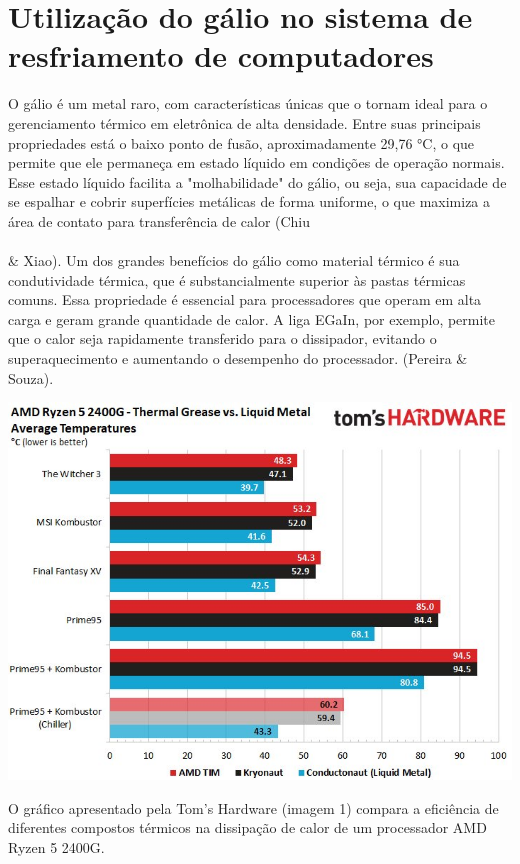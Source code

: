 \documentclass{article}
\begin{document}
\section{Utilização do gálio no sistema de resfriamento de computadores}
O gálio é um metal raro, com características únicas que o tornam ideal para o gerenciamento térmico em eletrônica de alta densidade. Entre suas principais propriedades está o baixo ponto de fusão, aproximadamente 29,76 °C, o que permite que ele permaneça em estado líquido em condições de operação normais. Esse estado líquido facilita a "molhabilidade" do gálio, ou seja, sua capacidade de se espalhar e cobrir superfícies metálicas de forma uniforme, o que maximiza a área de contato para transferência de calor (Chiu \\\\\& Xiao).
Um dos grandes benefícios do gálio como material térmico é sua condutividade térmica, que é substancialmente superior às pastas térmicas comuns. Essa propriedade é essencial para processadores que operam em alta carga e geram grande quantidade de calor. A liga EGaIn, por exemplo, permite que o calor seja rapidamente transferido para o dissipador, evitando o superaquecimento e aumentando o desempenho do processador. (Pereira \& Souza).
\begin{adjustbox}{center,caption={Grafico Comparativo entre Pasta térmica e Metal liquido (Imagem: Tom's Hardware)},nofloat=figure,vspace=\bigskipamount}
    \includegraphics[width=15cm]{tio_hardware.jpg}
\end{adjustbox}
O gráfico apresentado pela Tom's Hardware (imagem 1) compara a eficiência de diferentes compostos térmicos na dissipação de calor de um processador AMD Ryzen 5 2400G. 
\end{document}
